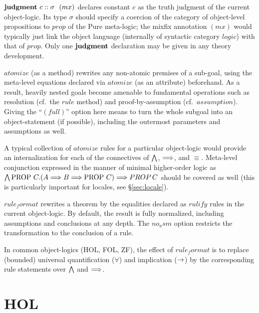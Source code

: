 \begin{descr}
  
\item [${\mathord{\mathbf{judgment}}}~c::\sigma~~(mx)$] declares constant $c$ as the
  truth judgment of the current object-logic.  Its type $\sigma$ should
  specify a coercion of the category of object-level propositions to $prop$ of
  the Pure meta-logic; the mixfix annotation $(mx)$ would typically just link
  the object language (internally of syntactic category $logic$) with that of
  $prop$.  Only one ${\mathord{\mathbf{judgment}}}$ declaration may be given in any
  theory development.
  
\item [$atomize$] (as a method) rewrites any non-atomic premises of a
  sub-goal, using the meta-level equations declared via $atomize$ (as an
  attribute) beforehand.  As a result, heavily nested goals become amenable to
  fundamental operations such as resolution (cf.\ the $rule$ method) and
  proof-by-assumption (cf.\ $assumption$).  Giving the ``$(full)$'' option
  here means to turn the whole subgoal into an object-statement (if possible),
  including the outermost parameters and assumptions as well.

  A typical collection of $atomize$ rules for a particular object-logic would
  provide an internalization for each of the connectives of $\bigwedge$, $\Longrightarrow$,
  and $\equiv$.  Meta-level conjunction expressed in the manner of minimal
  higher-order logic as $\bigwedge\mathop{\mathrm{PROP}}\,C. (A \Longrightarrow B \Longrightarrow \mathop{\mathrm{PROP}}\,C) \Longrightarrow PROP\,C$
  should be covered as well (this is particularly important for locales, see
  \S\ref{sec:locale}).

\item [$rule_format$] rewrites a theorem by the equalities declared as
  $rulify$ rules in the current object-logic.  By default, the result is fully
  normalized, including assumptions and conclusions at any depth.  The
  $no_asm$ option restricts the transformation to the conclusion of a rule.

  In common object-logics (HOL, FOL, ZF), the effect of $rule_format$ is to
  replace (bounded) universal quantification ($\forall$) and implication
  ($\rightarrow$) by the corresponding rule statements over $\bigwedge$ and $\Longrightarrow$.

\end{descr}


\section{HOL}


